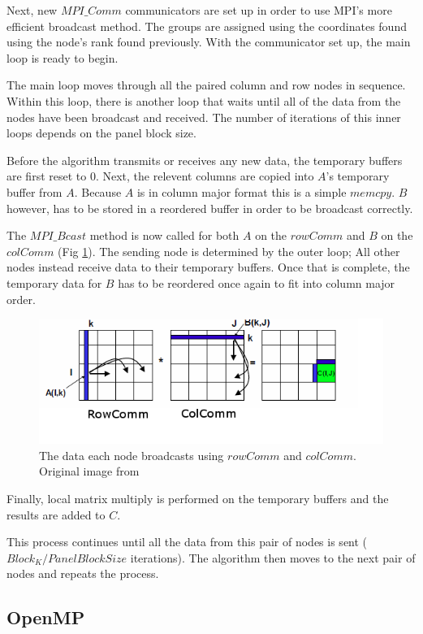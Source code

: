 \documentclass[11pt, twocolumn]{article}
\begin{document}
Next, new $MPI\_Comm$ communicators are set up in order to use MPI's more efficient broadcast method. The groups are assigned using the coordinates found using the node's rank found previously. With the communicator set up, the main loop is ready to begin.

The main loop moves through all the paired column and row nodes in sequence. Within this loop, there is another loop that waits until all of the data from the nodes have been broadcast and received. The number of iterations of this inner loops depends on the panel block size.

Before the algorithm transmits or receives any new data, the temporary buffers are first reset to 0. Next, the relevent columns are copied into $A$'s temporary buffer from $A$. Because $A$ is in column major format this is a simple $memcpy$. $B$ however, has to be stored in a reordered buffer in order to be broadcast correctly.

The $MPI\_Bcast$ method is now called for both $A$ on the $rowComm$ and $B$ on the $colComm$ (Fig \ref{fig:Comms}). The sending node is determined by the outer loop; All other nodes instead receive data to their temporary buffers. Once that is complete, the temporary data for $B$ has to be reordered once again to fit into column major order.

\begin{figure}[h]
\includegraphics[scale=.5]{Images/Comms.png}
\caption{The data each node broadcasts using $rowComm$ and $colComm$. Original image from \cite{COMMS_FIG}}
\label{fig:Comms}
\end{figure}

Finally, local matrix multiply is performed on the temporary buffers and the results are added to $C$.

This process continues until all the data from this pair of nodes is sent ($Block_K / PanelBlockSize$ iterations). The algorithm then moves to the next pair of nodes and repeats the process.
\subsection{OpenMP}
\end{document}
